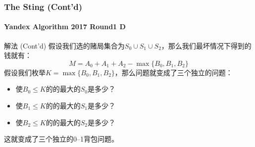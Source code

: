 \documentclass[hyperref={unicode=true}]{beamer}
\begin{document}
  \begin{frame}\frametitle{The Sting (Cont'd)}
    \framesubtitle{Yandex Algorithm 2017 Round1 D}
    \begin{exampleblock}{解法 (Cont'd)}
      假设我们选的赌局集合为$S_0 \cup S_1 \cup S_2$，那么我们最坏情况下得到的钱就有：
      \[M = A_0+A_1+A_2-\max{\{B_0,B_1,B_2\}}\]
      假设我们枚举$K=\max{\{B_0,B_1,B_2\}}$，那么问题就变成了三个独立的问题：
      \begin{itemize}
        \item 使$B_0\leq K$的的最大的$S_0$是多少？
        \item 使$B_1\leq K$的的最大的$S_1$是多少？
        \item 使$B_2\leq K$的的最大的$S_2$是多少？
      \end{itemize}
      这就变成了三个独立的0--1背包问题。
    \end{exampleblock}
  \end{frame}
\end{document}
